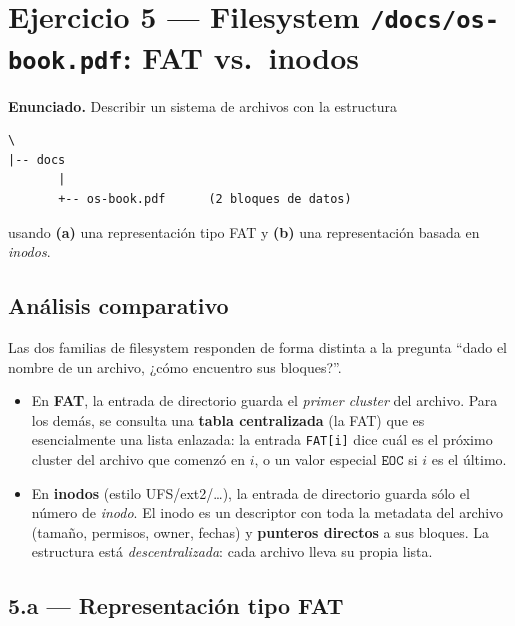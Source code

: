 \documentclass[11pt,a4paper]{article}
\begin{document}
\section{Ejercicio 5 --- Filesystem \texttt{/docs/os-book.pdf}: FAT vs.\ inodos}

\textbf{Enunciado.} Describir un sistema de archivos con la estructura

\begin{lstlisting}[style=textstyle]
\
|-- docs
       |
       +-- os-book.pdf      (2 bloques de datos)
\end{lstlisting}

\noindent usando \textbf{(a)} una representación tipo FAT y
\textbf{(b)} una representación basada en \emph{inodos}.

\subsection*{Análisis comparativo}

Las dos familias de filesystem responden de forma distinta a la
pregunta ``dado el nombre de un archivo, ¿cómo encuentro sus
bloques?''.

\begin{itemize}[leftmargin=*,nosep]
    \item En \textbf{FAT}, la entrada de directorio guarda el
        \emph{primer cluster} del archivo. Para los demás, se consulta
        una \textbf{tabla centralizada} (la FAT) que es esencialmente
        una lista enlazada: la entrada \texttt{FAT[i]} dice cuál es el
        próximo cluster del archivo que comenzó en $i$, o un valor
        especial $\texttt{EOC}$ si $i$ es el último.
    \item En \textbf{inodos} (estilo UFS/ext2/\ldots), la entrada de
        directorio guarda sólo el número de \emph{inodo}. El inodo es
        un descriptor con toda la metadata del archivo (tamaño,
        permisos, owner, fechas) y \textbf{punteros directos} a sus
        bloques. La estructura está \emph{descentralizada}: cada
        archivo lleva su propia lista.
\end{itemize}

\subsection*{5.a --- Representación tipo FAT}
\end{document}
